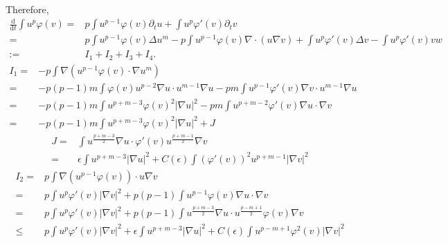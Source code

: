 \documentclass[12pt,]{article}
\begin{document}
Therefore, 
\begin{equation}
\begin{aligned}
\frac{\mathrm{d}}{\mathrm{d} t} \int u^{p} \varphi(v)=&p\int u^{p-1}\varphi(v)\partial_t u  + \int u^p\varphi'(v)\partial_tv\\
  =&p\int u^{p-1}\varphi(v)\Delta u^m- p\int u^{p-1}\varphi(v)\nabla\cdot(u\nabla v) + \int u^p\varphi'(v)\Delta v - \int u^p\varphi'(v)vw\\
  :=& I_1 + I_2 + I_3 + I_4.
\end{aligned}
\end{equation}
\begin{equation}
  \begin{aligned}
    I_1=&-p\int \nabla(u^{p-1}\varphi(v)\cdot\nabla u^m)\\
    =&-p(p-1)m\int \varphi(v)u^{p-2}\nabla u \cdot u^{m-1}\nabla u - pm\int u^{p-1}\varphi'(v)\nabla v \cdot u ^{m-1}\nabla u \\
    =&-p(p-1)m\int u^{p+m-3}\varphi(v)^2|\nabla u| ^2 - pm \int u^{p+m-2}\varphi'(v)\nabla u \cdot \nabla v\\
    =&-p(p-1)m\int u^{p+m-3}\varphi(v)^2|\nabla u| ^2 + J
  \end{aligned}
\end{equation}
\begin{equation}
  \begin{align}
    J =& \int u^{\frac{p+m-3}{2}}\nabla u\cdot\varphi'(v)u^{\frac{p+m-1}{2}}\nabla v\\
    =&\epsilon \int u^{p+m-3}|\nabla u|^2 + C(\epsilon)\int (\varphi'(v))^2u^{p+m-1}|\nabla v|^2
  \end{align}
\end{equation}
\begin{equation}
  \begin{align}
    I_2 =& p\int \nabla(u^{p-1}\varphi(v))\cdot u\nabla v\\
    =& p\int u^p\varphi'(v)|\nabla v|^2 + p(p-1)\int u^{p-1}\varphi(v)\nabla u\cdot \nabla v\\
    = & p\int u^p\varphi'(v)|\nabla v|^2 + p(p-1)\int u^{\frac{p+m-3}{2}}\nabla u \cdot u^{\frac{p-m+1}{2}} \varphi(v)\nabla v\\
    \leqslant & p\int u^p\varphi'(v)|\nabla v|^2 + \epsilon \int u^{p+m-3}|\nabla u|^{2} + C(\epsilon)\int u^{p-m+1}\varphi^2(v)|\nabla v|^2
  \end{align}
\end{equation}
\end{document}
